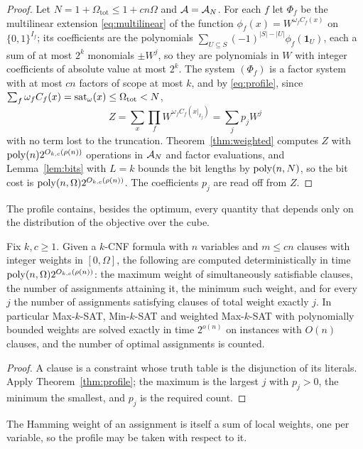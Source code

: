 \begin{proof}
Let $N=1+\Omega_{\mathrm{tot}}\le 1+cn\Omega$ and $\mathcal{A}=\mathcal{A}_N$. For each $f$ let
$\Phi_f$ be the multilinear extension \eqref{eq:multilinear} of the function
$\phi_f(x)=W^{\omega_f C_f(x)}$ on $\{0,1\}^{I_f}$; its coefficients are the
polynomials $\sum_{U\subseteq S}(-1)^{|S|-|U|}\phi_f(\mathbf 1_U)$, each a sum of
at most $2^k$ monomials $\pm W^{j}$, so they are polynomials in $W$ with integer
coefficients of absolute value at most $2^k$. The system $(\Phi_f)$ is a factor
system with at most $cn$ factors of scope at most $k$, and by
\eqref{eq:profile}, since $\sum_f\omega_fC_f(x)=\operatorname{sat}_\omega(x)\le\Omega_{\mathrm{tot}}<N$,
\[
  Z=\sum_{x}\prod_f W^{\omega_fC_f(x|_{I_f})}=\sum_{j}p_jW^{j}
\]
with no term lost to the truncation. Theorem~\ref{thm:weighted} computes $Z$
with $\operatorname{poly}(n)2^{O_{k,c}(\rho(n))}$ operations in $\mathcal{A}_N$ and factor
evaluations, and Lemma~\ref{lem:bits} with $L=k$ bounds the bit lengths by
$\operatorname{poly}(n,N)$, so the bit cost is $\operatorname{poly}(n,\Omega)2^{O_{k,c}(\rho(n))}$. The
coefficients $p_j$ are read off from $Z$.
\end{proof}

The profile contains, besides the optimum, every quantity that depends only on
the distribution of the objective over the cube.

\begin{corollary}\label{cor:maxsat}
Fix $k,c\ge1$. Given a $k$-CNF formula with $n$ variables and $m\le cn$ clauses
with integer weights in $[0,\Omega]$, the following are computed deterministically
in time $\operatorname{poly}(n,\Omega)2^{O_{k,c}(\rho(n))}$: the maximum weight of
simultaneously satisfiable clauses, the number of assignments attaining it, the
minimum such weight, and for every $j$ the number of assignments satisfying
clauses of total weight exactly $j$. In particular Max-$k$-SAT, Min-$k$-SAT and
weighted Max-$k$-SAT with polynomially bounded weights are solved exactly in time
$2^{o(n)}$ on instances with $O(n)$ clauses, and the number of optimal
assignments is counted.
\end{corollary}

\begin{proof}
A clause is a constraint whose truth table is the disjunction of its literals.
Apply Theorem~\ref{thm:profile}; the maximum is the largest $j$ with $p_j>0$,
the minimum the smallest, and $p_j$ is the required count.
\end{proof}

The Hamming weight of an assignment is itself a sum of local weights, one per
variable, so the profile may be taken with respect to it.

